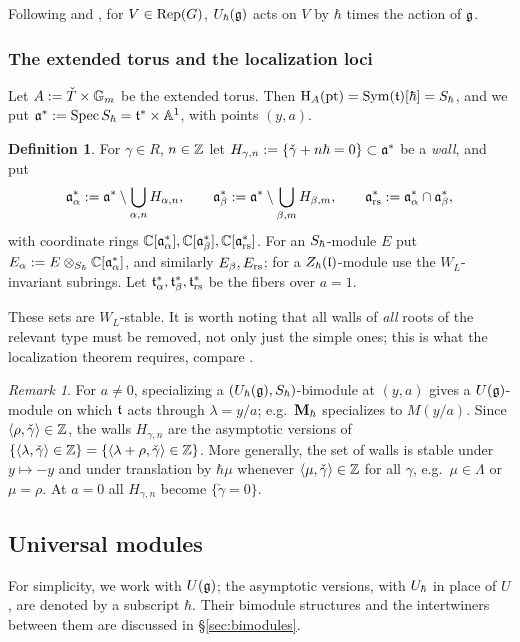 \documentclass{article}
\theoremstyle{plain}
\theoremstyle{definition}
\newtheorem{definition}[theorem]{Definition}
\theoremstyle{remark}
\newtheorem{remark}[theorem]{Remark}
\numberwithin{equation}{section}
\begin{document}
Following \cite{bezrukavnikov2026equivariantsatakecategorykostantwhittaker} and \cite{ginzburg2014differentialoperatorsguaffine},
for $V\in\operatorname{Rep}(G)$, $U_\hbar(\mathfrak{g})$ acts on $V$ by $\hbar$ times the action of $\mathfrak{g}$.

\subsubsection*{The extended torus and the localization loci}
Let $A:={\check{T}}\times\mathbb{G}_m$ be the extended torus. Then $\mathrm{H}_A(\mathrm{pt})=\operatorname{Sym}(\mathfrak{t})[\hbar]=S_\hbar$, and we put $\mathfrak{a}^*:=\operatorname{Spec}S_\hbar=\mathfrak{t}^*\times\mathbb{A}^1$, with points $(y,a)$.

\begin{definition}\label{def:loci}
For $\gamma\in R$, $n\in\mathbb{Z}$ let $H_{\gamma,n}:=\{\check\gamma+n\hbar=0\}\subset\mathfrak{a}^*$ be a \emph{wall}, and put
\[
\mathfrak{a}^*_{\alpha}:=\mathfrak{a}^*\setminus\bigcup_{\alpha,n}H_{\alpha,n},\qquad
\mathfrak{a}^*_{\beta}:=\mathfrak{a}^*\setminus\bigcup_{\beta,m}H_{\beta,m},\qquad
\mathfrak{a}^*_{\mathrm{rs}}:=\mathfrak{a}^*_{\alpha}\cap\mathfrak{a}^*_{\beta} ,
\]
with coordinate rings $\mathbb{C}[\mathfrak{a}^*_{\alpha}],\mathbb{C}[\mathfrak{a}^*_{\beta}],\mathbb{C}[\mathfrak{a}^*_{\mathrm{rs}}]$. For an $S_\hbar$-module $E$ put $E_\alpha:=E\otimes_{S_\hbar}\mathbb{C}[\mathfrak{a}^*_{\alpha}]$, and similarly $E_\beta,E_{\mathrm{rs}}$; for a $Z_\hbar(\mathfrak{l})$-module use the $W_L$-invariant subrings. Let $\mathfrak{t}^*_\alpha,\mathfrak{t}^*_\beta,\mathfrak{t}^*_{\mathrm{rs}}$ be the fibers over $a=1$.
\end{definition}

These sets are $W_L$-stable. It is worth noting that all walls of \emph{all} roots of the relevant type must be removed, not only just the simple ones; this is what the localization theorem requires, compare \cite[Proposition 2.1.6]{macerato2023leviequivariantrestrictionsphericalperverse}.

\begin{remark}\label{rem:specialization}
For $a\neq0$, specializing a $(U_\hbar(\mathfrak{g}),S_\hbar)$-bimodule at $(y,a)$ gives a $U(\mathfrak{g})$-module on which $\mathfrak{t}$ acts through $\lambda=y/a$; e.g.\ $\mathbf{M}_\hbar$ specializes to $M(y/a)$. Since $\langle\rho,\check\gamma\rangle\in\mathbb{Z}$, the walls $H_{\gamma,n}$ are the asymptotic versions of $\{\langle\lambda,\check\gamma\rangle\in\mathbb{Z}\}=\{\langle\lambda+\rho,\check\gamma\rangle\in\mathbb{Z}\}$. More generally, the set of walls is stable under $y\mapsto-y$ and under translation by $\hbar\mu$ whenever $\langle\mu,\check\gamma\rangle\in\mathbb{Z}$ for all $\gamma$, e.g.\ $\mu\in\Lambda$ or $\mu=\rho$. At $a=0$ all $H_{\gamma,n}$ become $\{\check\gamma=0\}$.
\end{remark}

\subsection{Universal modules}\label{sec:universal}
For simplicity, we work with $U(\mathfrak{g})$; the asymptotic versions, with $U_\hbar$ in place of $U$, are denoted by a subscript $\hbar$. Their bimodule structures and the intertwiners between them are discussed in \S\ref{sec:bimodules}.
\end{document}
